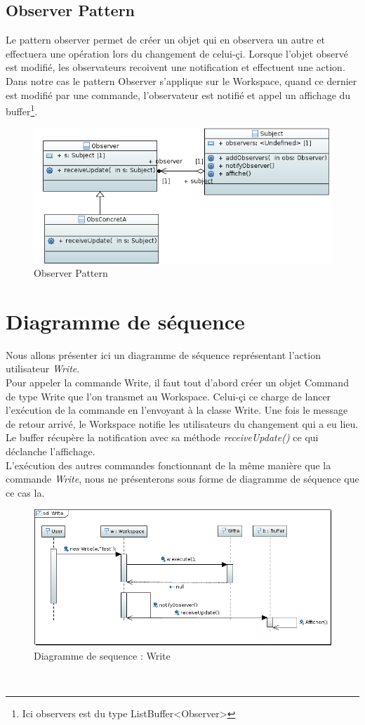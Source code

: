 \documentclass[11pt,a4paper,oldfontcommands]{memoir}
\begin{document}
\subsection{Observer Pattern}
Le pattern observer permet de créer un objet qui en observera un autre et effectuera une opération lors du changement de celui-çi. Lorsque l'objet observé est modifié, les observateurs recoivent une notification et effectuent une action. Dans notre cas le pattern Observer s'applique sur le Workspace, quand ce dernier est modifié par une commande, l'observateur est notifié et appel un affichage du buffer\footnote{Ici observers est du type ListBuffer<Observer>}. \\
\begin{figure}[!ht]
\centering 
\includegraphics[width=13cm]{ObserverPattern.png}
\caption{Observer Pattern }
\label{figure5}
\end{figure}
\section{Diagramme de séquence}
Nous allons présenter ici un diagramme de séquence représentant l'action utilisateur \emph{Write}.\\
Pour appeler la commande Write, il faut tout d'abord créer un objet Command de type Write que l'on transmet au Workspace. Celui-çi ce charge de lancer l'exécution de la commande en l'envoyant à la classe Write. Une fois le message de retour arrivé, le Workspace notifie les utilisateurs du changement qui a eu lieu. Le buffer récupère la notification avec sa méthode \emph{receiveUpdate()} ce qui déclanche l'affichage. \\
L'exécution des autres commandes fonctionnant de la même manière que la commande \emph{Write}, nous ne présenterons sous forme de diagramme de séquence que ce cas la. \\
\begin{figure}[!ht]
\centering 
\includegraphics[width=13cm]{diagSeq.png}
\caption{Diagramme de sequence : Write}
\label{figure6}
\end{figure}
\\
\end{document}
